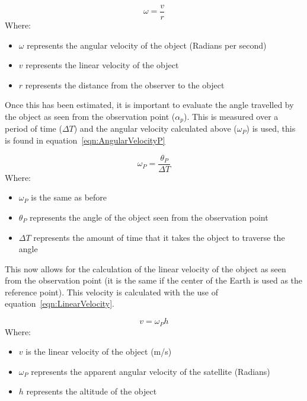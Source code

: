\documentclass[11pt]{witseiepaper}
\begin{document}
\begin{bibunit}[witseie]
\begin{equation} \label{eqn:AngularVelocity}
\omega = \frac{v}{r}
\end{equation}
Where:
\begin{itemize}
    \item $\omega$ represents the angular velocity of the object (Radians per second)
    \item $v$ represents the linear velocity of the object
    \item $r$ represents the distance from the observer to the object
\end{itemize}

Once this has been estimated, it is important to evaluate the angle travelled by the object as seen from the observation point ($\alpha_{p}$). This is measured over a period of time ($\Delta T$) and the angular velocity calculated above ($\omega_{P}$) is used, this is found in equation~\ref{eqn:AngularVelocityP}

\begin{equation} \label{eqn:AngularVelocityP}
    \omega_{P} = \frac{\theta_{P}}{\Delta T}
\end{equation}
Where:
\begin{itemize}
    \item $\omega_{P}$ is the same as before
    \item $\theta_{P}$ represents the angle of the object seen from the observation point
    \item $\Delta T$ represents the amount of time that it takes the object to traverse the angle
\end{itemize}

This now allows for the calculation of the linear velocity of the object as seen from the observation point (it is the same if the center of the Earth is used as the reference point). This velocity is calculated with the use of equation~\ref{eqn:LinearVelocity}.

\begin{equation} \label{eqn:LinearVelocity}
    v = \omega_{P} h
\end{equation}
Where:
\begin{itemize}
    \item $v$ is the linear velocity of the object (m/s)
    \item $\omega_{P}$ represents the apparent angular velocity of the satellite (Radians)
    \item $h$ represents the altitude of the object
\end{itemize}



\end{bibunit}
\end{document}
